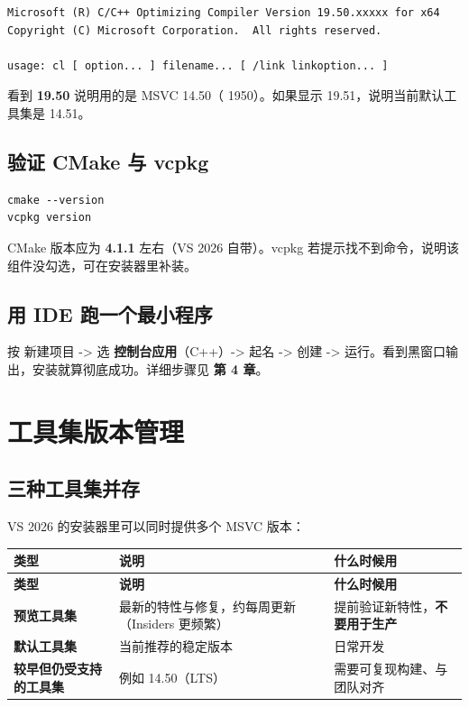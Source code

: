 \begin{lstlisting}[style=textstyle]
Microsoft (R) C/C++ Optimizing Compiler Version 19.50.xxxxx for x64
Copyright (C) Microsoft Corporation.  All rights reserved.

usage: cl [ option... ] filename... [ /link linkoption... ]
\end{lstlisting}

看到 \textbf{19.50} 说明用的是 MSVC 14.50（ 1950）。如果显示 19.51，说明当前默认工具集是 14.51。

\subsection{验证 CMake 与 vcpkg}
\begin{lstlisting}[style=shellstyle]
cmake --version
vcpkg version
\end{lstlisting}

CMake 版本应为 \textbf{4.1.1} 左右（VS 2026 自带）。vcpkg 若提示找不到命令，说明该组件没勾选，可在安装器里补装。

\subsection{用 IDE 跑一个最小程序}
按  新建项目 -> 选 \textbf{控制台应用}（C++）-> 起名 -> 创建 ->  运行。看到黑窗口输出，安装就算彻底成功。详细步骤见 \textbf{第 4 章}。

\section{工具集版本管理}
\subsection{三种工具集并存}
VS 2026 的安装器里可以同时提供多个 MSVC 版本：

\begin{longtable}{L{3.4cm}L{7.2cm}L{4.0cm}}
\toprule
\textbf{类型} & \textbf{说明} & \textbf{什么时候用} \\
\midrule
\endfirsthead
\toprule
\textbf{类型} & \textbf{说明} & \textbf{什么时候用} \\
\midrule
\endhead
\bottomrule
\endlastfoot
\textbf{预览工具集} & 最新的特性与修复，约每周更新（Insiders 更频繁） & 提前验证新特性，\textbf{不要用于生产} \\
\textbf{默认工具集} & 当前推荐的稳定版本 & 日常开发 \\
\textbf{较早但仍受支持的工具集} & 例如 14.50（LTS） & 需要可复现构建、与团队对齐 \\
\end{longtable}

